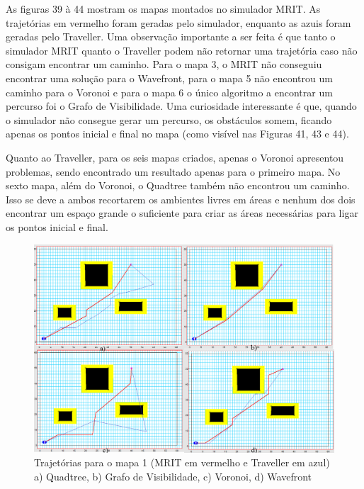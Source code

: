 As figuras 39 à 44 mostram os mapas montados no simulador MRIT. As trajetórias em vermelho foram geradas pelo simulador, enquanto as azuis foram geradas pelo Traveller. Uma observação importante a ser feita é que tanto o simulador MRIT quanto o Traveller podem não retornar uma trajetória caso não consigam encontrar um caminho. Para o mapa 3, o MRIT não conseguiu encontrar uma solução para o Wavefront, para o mapa 5 não encontrou um caminho para o Voronoi e para o mapa 6 o único algoritmo a encontrar um percurso foi o Grafo de Visibilidade. Uma curiosidade interessante é que, quando o simulador não consegue gerar um percurso, os obstáculos somem, ficando apenas os pontos inicial e final no mapa (como visível nas Figuras 41, 43 e 44).

Quanto ao Traveller, para os seis mapas criados, apenas o Voronoi apresentou problemas, sendo encontrado um resultado apenas para o primeiro mapa. No sexto mapa, além do Voronoi, o Quadtree também não encontrou um caminho. Isso se deve a ambos recortarem os ambientes livres em áreas e nenhum dos dois encontrar um espaço grande o suficiente para criar as áreas necessárias para ligar os pontos inicial e final.

\begin{figure}[h]
	\centering
	\label{fig39}
		\includegraphics[keepaspectratio=true,scale=0.3]{figuras/mapa1.jpg}
	\caption{Trajetórias para o mapa 1 (MRIT em vermelho e Traveller em azul) a) Quadtree, b) Grafo de Visibilidade, c) Voronoi, d) Wavefront}
\end{figure}

